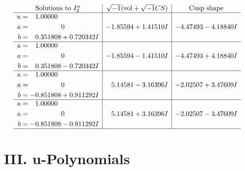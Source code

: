 \documentclass[1p]{elsarticle_modified}
\theoremstyle{definition}
\newcommand{\I}{\sqrt{-1}}
\begin{document}
$$\begin{array}{c|c|c}  
\text{Solutions to }I^u_{2}& \I (\text{vol} + \sqrt{-1}CS) & \text{Cusp shape}\\
 \hline 
\begin{aligned}
u &= \phantom{-}1.00000\phantom{ +0.000000I} \\
a &= \phantom{-0.000000 } 0 \\
b &= \phantom{-}0.351808 + 0.720342 I\end{aligned}
 & -1.85594 + 1.41510 I & -4.47493 - 4.18840 I \\ \hline\begin{aligned}
u &= \phantom{-}1.00000\phantom{ +0.000000I} \\
a &= \phantom{-0.000000 } 0 \\
b &= \phantom{-}0.351808 - 0.720342 I\end{aligned}
 & -1.85594 - 1.41510 I & -4.47493 + 4.18840 I \\ \hline\begin{aligned}
u &= \phantom{-}1.00000\phantom{ +0.000000I} \\
a &= \phantom{-0.000000 } 0 \\
b &= -0.851808 + 0.911292 I\end{aligned}
 & \phantom{-}5.14581 - 3.16396 I & -2.02507 + 3.47609 I \\ \hline\begin{aligned}
u &= \phantom{-}1.00000\phantom{ +0.000000I} \\
a &= \phantom{-0.000000 } 0 \\
b &= -0.851808 - 0.911292 I\end{aligned}
 & \phantom{-}5.14581 + 3.16396 I & -2.02507 - 3.47609 I\\
 \hline 
 \end{array}$$\newpage
\newpage\renewcommand{\arraystretch}{1}
\centering \section*{ III. u-Polynomials}
\end{document}
